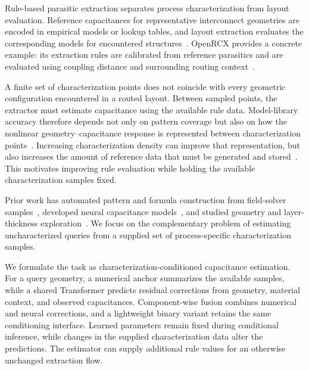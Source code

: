
Rule-based parasitic extraction separates process characterization from layout
 evaluation. Reference capacitances for representative interconnect geometries
are encoded in empirical models or lookup tables, and layout extraction evaluates
the corresponding models for encountered structures~\cite{tsai2025geometry,yang2023cnncap}.
OpenRCX provides a concrete example: its extraction rules are calibrated from
reference parasitics and are evaluated using coupling distance and surrounding
routing context~\cite{orcx_runtime,orcx_calibration}.

A finite set of characterization points does not coincide with every geometric
configuration encountered in a routed layout. Between sampled points, the
extractor must estimate capacitance using the available rule data. Model-library
accuracy therefore depends not only on pattern coverage but also on how the
nonlinear geometry--capacitance response is represented between characterization
points~\cite{zhou2026rmlpcap}. Increasing characterization density can improve
that representation, but also increases the amount of reference data that must
be generated and stored~\cite{yang2023cnncap}. This motivates improving rule
evaluation while holding the available characterization samples fixed.

Prior work has automated pattern and formula construction from field-solver
samples~\cite{li2020autoprechar}, developed neural capacitance
models~\cite{yang2023cnncap,zhou2026rmlpcap}, and studied geometry and
layer-thickness exploration~\cite{tsai2025geometry}. We focus on the complementary
problem of estimating uncharacterized queries from a supplied set of
process-specific characterization samples.

We formulate the task as characterization-conditioned capacitance estimation.
For a query geometry, a numerical anchor summarizes the available samples, while
a shared Transformer predicts residual corrections from geometry, material
context, and observed capacitances. Component-wise fusion combines numerical and
neural corrections, and a lightweight binary variant retains the same
conditioning interface. Learned parameters remain fixed during conditional
inference, while changes in the supplied characterization data alter the
predictions. The estimator can supply additional rule values for an otherwise
unchanged extraction flow.

